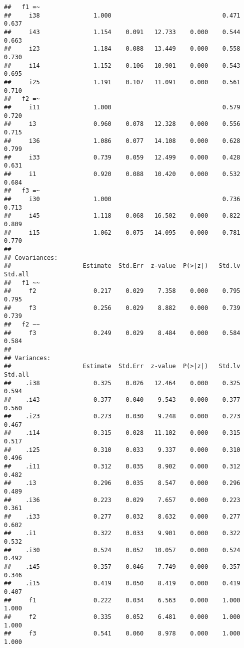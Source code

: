 \documentclass[
]{article}
\begin{document}
\begin{verbatim}
##   f1 =~                                                                 
##     i38               1.000                               0.471    0.637
##     i43               1.154    0.091   12.733    0.000    0.544    0.663
##     i23               1.184    0.088   13.449    0.000    0.558    0.730
##     i14               1.152    0.106   10.901    0.000    0.543    0.695
##     i25               1.191    0.107   11.091    0.000    0.561    0.710
##   f2 =~                                                                 
##     i11               1.000                               0.579    0.720
##     i3                0.960    0.078   12.328    0.000    0.556    0.715
##     i36               1.086    0.077   14.108    0.000    0.628    0.799
##     i33               0.739    0.059   12.499    0.000    0.428    0.631
##     i1                0.920    0.088   10.420    0.000    0.532    0.684
##   f3 =~                                                                 
##     i30               1.000                               0.736    0.713
##     i45               1.118    0.068   16.502    0.000    0.822    0.809
##     i15               1.062    0.075   14.095    0.000    0.781    0.770
## 
## Covariances:
##                    Estimate  Std.Err  z-value  P(>|z|)   Std.lv  Std.all
##   f1 ~~                                                                 
##     f2                0.217    0.029    7.358    0.000    0.795    0.795
##     f3                0.256    0.029    8.882    0.000    0.739    0.739
##   f2 ~~                                                                 
##     f3                0.249    0.029    8.484    0.000    0.584    0.584
## 
## Variances:
##                    Estimate  Std.Err  z-value  P(>|z|)   Std.lv  Std.all
##    .i38               0.325    0.026   12.464    0.000    0.325    0.594
##    .i43               0.377    0.040    9.543    0.000    0.377    0.560
##    .i23               0.273    0.030    9.248    0.000    0.273    0.467
##    .i14               0.315    0.028   11.102    0.000    0.315    0.517
##    .i25               0.310    0.033    9.337    0.000    0.310    0.496
##    .i11               0.312    0.035    8.902    0.000    0.312    0.482
##    .i3                0.296    0.035    8.547    0.000    0.296    0.489
##    .i36               0.223    0.029    7.657    0.000    0.223    0.361
##    .i33               0.277    0.032    8.632    0.000    0.277    0.602
##    .i1                0.322    0.033    9.901    0.000    0.322    0.532
##    .i30               0.524    0.052   10.057    0.000    0.524    0.492
##    .i45               0.357    0.046    7.749    0.000    0.357    0.346
##    .i15               0.419    0.050    8.419    0.000    0.419    0.407
##     f1                0.222    0.034    6.563    0.000    1.000    1.000
##     f2                0.335    0.052    6.481    0.000    1.000    1.000
##     f3                0.541    0.060    8.978    0.000    1.000    1.000
\end{verbatim}
\end{document}
